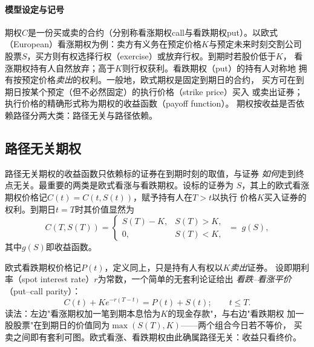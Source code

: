 \paragraph{模型设定与记号}
期权$C$是一份买或卖的合约（分别称看涨期权call与看跌期权put）。以欧式
（European）看涨期权为例：卖方有义务在预定价格$K$与预定未来时刻交割公司
股票$S$，买方则有权选择行权（exercise）或放弃行权。到期时若股价低于$K$，
看涨期权持有人自然放弃；高于$K$则行权获利。看跌期权（put）的持有人对称地
拥有按预定价格\emph{卖出}的权利。一般地，欧式期权是固定到期日的合约，
买方可在到期日按某个预定（但不必然固定）的执行价格（strike price）买入
或卖出证券；执行价格的精确形式称为期权的收益函数（payoff function）。
期权按收益是否依赖路径分两大类：路径无关与路径依赖。

\subsection{路径无关期权}

路径无关期权的收益函数只依赖标的证券在到期时刻的取值，与证券
\emph{如何}走到终点无关。最重要的两类是欧式看涨与看跌期权。设标的证券为
$S$，其上的欧式看涨期权价格记$C(t)=C(t,S(t))$，赋予持有人在$T>t$以执行
价格$K$买入证券的权利。到期日$t=T$时其价值显然为
\begin{equation*}
C(T,S(T))=
\begin{cases}
S(T)-K, & S(T)>K,\\[2pt]
0, & S(T)<K,
\end{cases}
\;=\;g(S),
\end{equation*}
其中$g(S)$即收益函数。


欧式看跌期权价格记$P(t)$，定义同上，只是持有人有权以$K$\emph{卖出}证券。
设即期利率（spot interest rate）$r$为常数，一个简单的无套利论证给出
\emph{看跌--看涨平价}（put--call parity）：
\begin{equation*}
C(t)+Ke^{-r(T-t)}=P(t)+S(t);\qquad t\leq T.
\end{equation*}
读法：左边"看涨期权加一笔到期本息恰为$K$的现金存款"，与右边"看跌期权
加一股股票"在到期日的价值同为$\max(S(T),K)$——两个组合今日若不等价，
买卖之间即有套利可图。欧式看涨、看跌期权由此确属路径无关：收益只看终价。


